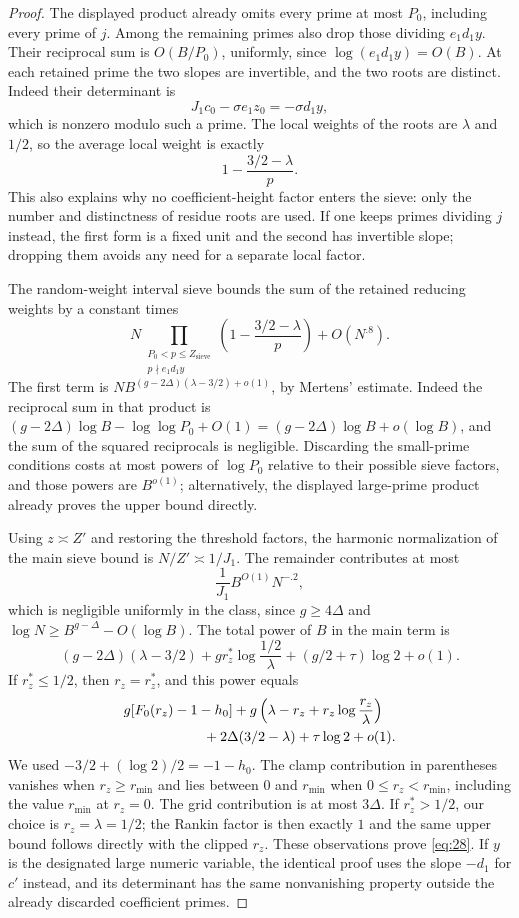 \begin{proof}
The displayed product already omits every prime at most $P_0$, including
every prime of $j$. Among the remaining primes also drop those dividing
$e_1d_1y$.  Their reciprocal sum is $O(B/P_0)$, uniformly, since
$\log(e_1d_1y)=O(B)$.  At each retained prime the two slopes are
invertible, and the two roots are distinct.  Indeed their determinant
is
\[
 J_1c_0-\sigma e_1z_0=-\sigma d_1y,
\]
which is nonzero modulo such a prime.  The local weights of the roots
are $\lambda$ and $1/2$, so the average local weight is exactly
\[
 1-\frac{3/2-\lambda}{p}.
\]
This also explains why no coefficient-height factor enters the sieve:
only the number and distinctness of residue roots are used.  If one
keeps primes dividing $j$ instead, the first form is a fixed unit and
the second has invertible slope; dropping them avoids any need for a
separate local factor.

The random-weight interval sieve bounds the sum of the retained
reducing weights by a constant times
\[
 N\prod_{\substack{P_0<p\le Z_{\mathrm{sieve}}\\p\nmid e_1d_1y}}
       \left(1-\frac{3/2-\lambda}{p}\right)
       +O(N^{.8}).
\]
The first term is
$N B^{(g-2\Delta)(\lambda-3/2)+o(1)}$, by Mertens' estimate.
Indeed the reciprocal sum in that product is
$(g-2\Delta)\log B-\log\log P_0+O(1)
 =(g-2\Delta)\log B+o(\log B)$, and the sum of the squared
reciprocals is negligible.  Discarding the small-prime conditions
costs at most powers of $\log P_0$ relative to their possible sieve
factors, and those powers are $B^{o(1)}$; alternatively, the displayed
large-prime product already proves the upper bound directly.

Using $z\asymp Z'$ and restoring the threshold factors, the harmonic
normalization of the main sieve bound is $N/Z'\asymp1/J_1$.  The
remainder contributes at most
\[
 \frac1{J_1} B^{O(1)}N^{-.2},
\]
which is negligible uniformly in the class, since $g\ge4\Delta$ and
$\log N\ge B^{g-\Delta}-O(\log B)$.  The total power of $B$ in the
main term is
\[
 (g-2\Delta)(\lambda-3/2)
       +g r_z^*\log\frac{1/2}{\lambda}
       +(g/2+\tau)\log2+o(1).
\]
If $r_z^*\le1/2$, then $r_z=r_z^*$, and this power equals
\[
 \begin{split}
 &g[F_0(r_z)-1-h_0]
   +g\left(\lambda-r_z+r_z\log\frac{r_z}{\lambda}\right)\\
 &\hspace{20mm}
   +2\Delta(3/2-\lambda)+\tau\log2+o(1).
 \end{split}
\]
We used $-3/2+(\log2)/2=-1-h_0$.  The clamp contribution in
parentheses vanishes when $r_z\ge r_{\min}$ and lies between $0$ and
$r_{\min}$ when $0\le r_z<r_{\min}$, including the value $r_{\min}$ at
$r_z=0$.  The grid contribution is at most $3\Delta$.
If $r_z^*>1/2$, our choice is $r_z=\lambda=1/2$; the Rankin factor is then
exactly $1$ and the same upper bound follows directly with the clipped
$r_z$.  These observations prove \eqref{eq:28}.  If $y$ is the designated
large numeric variable, the identical proof uses the slope $-d_1$
for $c'$ instead, and its determinant has the same nonvanishing
property outside the already discarded coefficient primes.


\end{proof}
